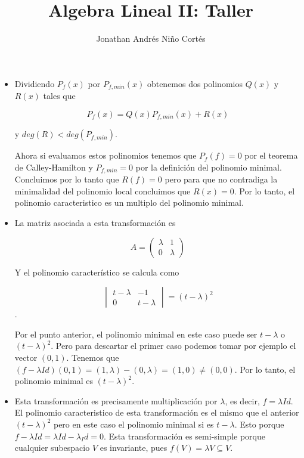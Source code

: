 \documentclass[letter,twoside,12pt]{article}
\title{Algebra Lineal II: Taller}
\author{Jonathan Andrés Niño Cortés}
\begin{document}
\maketitle

\begin{itemize}
\item Dividiendo $ P_f(x) $ por $ P_{f,min}(x) $ obtenemos dos polinomios $ Q(x) $ y $ R(x) $ tales que 

\begin{equation}
P_f(x)=Q(x)P_{f,min}(x)+R(x) \nonumber
\end{equation} 

y $ deg(R)<deg(P_{f,min}) $.

Ahora si evaluamos estos polinomios tenemos que $ P_f(f)=0 $ por el teorema de Calley-Hamilton y $ P_{f,min}=0 $ por la definición del polinomio minimal. Concluimos por lo tanto que $ R(f)=0 $ pero para que no contradiga la minimalidad del polinomio local concluimos que $ R(x)=0 $. Por lo tanto, el polinomio caracteristico es un multiplo del polinomio minimal.

\item La matriz asociada a esta transformación es

\begin{equation}
A=\begin{pmatrix}
\lambda & 1
\\0 & \lambda
\end{pmatrix} \nonumber
\end{equation}

Y el polinomio característico se calcula como

\begin{equation}
\begin{vmatrix}
t-\lambda & -1
\\0 & t- \lambda
\end{vmatrix} = (t-\lambda)^2 \nonumber
\end{equation}.

Por el punto anterior, el polinomio minimal en este caso puede ser $ t-\lambda $ o $ (t-\lambda)^2 $. Pero para descartar el primer caso podemos tomar por ejemplo el vector $ (0,1) $. Tenemos que $ (f-\lambda Id)(0,1)=(1,\lambda)-(0,\lambda)=(1,0) \not = (0,0)$. Por lo tanto, el polinomio minimal es $ (t-\lambda)^2 $.

\item Esta transformación es precisamente multiplicación por $ \lambda $, es decir, $ f= \lambda Id $. El polinomio caracteristico de esta transformación es el mismo que el anterior $ (t- \lambda)^2 $ pero en este caso el polinomio minimal si es $ t-\lambda $. Esto porque $ f-\lambda Id = \lambda Id - \lambda_Id = 0 $. Esta transformación es semi-simple porque cualquier subespacio $ V $ es invariante, pues $ f(V)= \lambda V \subseteq V $.  

\end{itemize}
\end{document}
